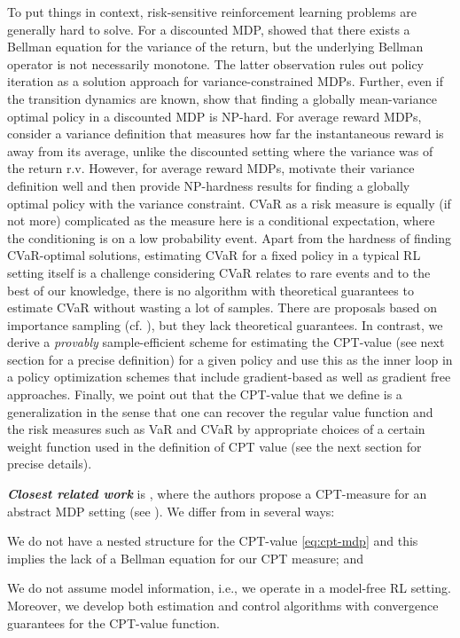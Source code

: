 \documentclass[11pt,letterpaper,english]{article}
\begin{document}
To put things in context, risk-sensitive reinforcement learning problems are generally hard to solve. 
For a discounted MDP, \cite{Sobel82VD} showed that there exists a Bellman equation for the variance of the return, but the underlying Bellman operator is not necessarily monotone. The latter observation rules out policy iteration as a solution approach for variance-constrained MDPs.
Further, even if the transition dynamics are known, \cite{mannor2013algorithmic} show that finding a globally mean-variance optimal policy in a discounted MDP is NP-hard.
For average reward MDPs, \cite{filar1989variance} consider a variance definition that measures how far the instantaneous reward is away from its average, unlike the discounted setting where the variance was of the return r.v. However, for average reward MDPs, \cite{filar1989variance} motivate their variance definition well and then provide NP-hardness results for finding a globally optimal policy with the variance constraint.
CVaR as a risk measure is equally (if not more) complicated as the measure here is a conditional expectation, where the conditioning is on a low probability event. Apart from the hardness of finding CVaR-optimal solutions, estimating CVaR for a fixed policy in a typical RL setting itself is a challenge considering CVaR relates to rare events and to the best of our knowledge, there is no algorithm with theoretical guarantees to estimate CVaR without wasting a lot of samples. There are proposals based on importance sampling (cf. \cite{prashanth2014policy,tamar2014optimizing}), but they lack theoretical guarantees. In contrast, we derive a \textit{provably} sample-efficient scheme for estimating the CPT-value (see next section for a precise definition) for a given policy and use this as the inner loop in a policy optimization schemes that include gradient-based as well as gradient free approaches. Finally, we point out that the CPT-value that we define is a generalization in the sense that one can recover the regular value function and the risk measures such as VaR and CVaR by appropriate choices of a certain weight function used in the definition of CPT value (see the next section for precise details).

\noindent
\textit{\textbf{Closest related work}} is \cite{lin2013stochastic}, where the authors propose a CPT-measure for an abstract MDP setting (see \cite{bertsekas2013abstract}). We differ from \cite{lin2013stochastic} in several ways:
\begin{inparaenum}[\bfseries (i)]
\item We do not have a nested structure for the CPT-value \eqref{eq:cpt-mdp} and this implies the lack of a Bellman equation for our CPT measure; and
\item We do not assume model information, i.e., we operate in a model-free RL setting. Moreover, we develop both estimation and control algorithms with convergence guarantees for the CPT-value function.
\end{inparaenum}
\end{document}
